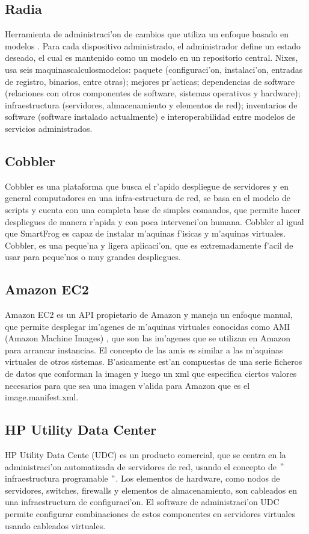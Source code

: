 \subsection{Radia}
Herramienta de administraci'on de cambios que utiliza un enfoque basado en modelos \cite{Radia15}. Para cada dispositivo administrado, el administrador define un estado deseado, el cual es mantenido como un modelo en un repositorio central. Nixes, usa seis maquinascalculosmodelos: paquete (configuraci'on, instalaci'on, entradas de registro, binarios, entre otras); mejores pr'acticas; dependencias de software (relaciones con otros componentes de software, sistemas operativos y hardware); infraestructura (servidores, almacenamiento y elementos de red); inventarios de software (software instalado actualmente) e interoperabilidad entre modelos de servicios administrados. 

\subsection{Cobbler}
Cobbler es una plataforma que busca el r'apido despliegue de servidores y en general computadores en una infra-estructura de red, se basa en el modelo de scripts y cuenta con una completa base de simples comandos, que permite hacer despliegues de manera r'apida y con poca intervenci'on humana. Cobbler al igual que SmartFrog es capaz de instalar m'aquinas f'isicas y m'aquinas virtuales. Cobbler, es una peque'na y ligera aplicaci'on, que es extremadamente f'acil de usar para peque'nos o muy grandes despliegues. \cite{6}

\subsection{Amazon EC2}
Amazon EC2 es un API propietario de Amazon y maneja un enfoque manual, que permite desplegar im'agenes de m'aquinas virtuales conocidas como AMI (Amazon Machine Images) \cite{9}, que son las im'agenes que se utilizan en Amazon para arrancar instancias. El concepto de las amis es similar a las m'aquinas virtuales de otros sistemas. B'asicamente est'an compuestas de una serie ficheros de datos que conforman la imagen y luego un xml que especifica ciertos valores necesarios para que sea una imagen v'alida para Amazon que es el image.manifest.xml. 

\subsection{HP Utility Data Center}
HP Utility Data Cente (UDC) es un producto comercial, que se centra en la administraci'on automatizada de servidores de red, usando el concepto de $"$infraestructura programable $"$. Los elementos de hardware, como nodos de servidores, switches, firewalls y elementos de almacenamiento, son cableados en una infraestructura de configuraci'on. El software de administraci'on UDC permite configurar combinaciones de estos componentes en servidores virtuales usando cableados virtuales. \cite{15}


